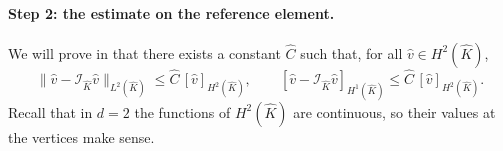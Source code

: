 \paragraph{Step 2: the estimate on the reference element.}
We will prove in  that there exists a constant $\widehat C$ such that, for all $\widehat v \in H^2(\widehat K)$,
\begin{equation}
    \label{eq:FEM reference estimate d=2}
    \| \widehat v - \mathcal I_{\widehat K} \widehat v \|_{L^2(\widehat K)} \le \widehat C\, [ \widehat v ]_{H^2(\widehat K)},
    \qquad
    [ \widehat v - \mathcal I_{\widehat K} \widehat v ]_{H^1(\widehat K)} \le \widehat C\, [ \widehat v ]_{H^2(\widehat K)}.
\end{equation}
Recall that in $d = 2$ the functions of $H^2(\widehat K)$ are continuous, so their values at the vertices make sense.

